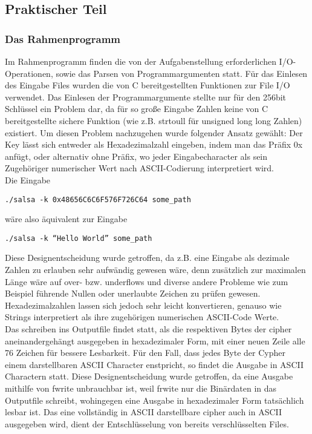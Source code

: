 \documentclass[course=erap]{aspdoc}
\begin{document}
\subsection{Praktischer Teil}
\subsubsection{Das Rahmenprogramm}
Im Rahmenprogramm finden die von der Aufgabenstellung erforderlichen I/O-Operationen, sowie das Parsen von Programmargumenten statt.
Für das Einlesen des Eingabe Files wurden die von C bereitgestellten Funktionen zur File I/O verwendet. Das Einlesen der Programmargumente stellte nur für den 256bit Schlüssel
ein Problem dar, da für so große Eingabe Zahlen keine von C bereitgestellte sichere Funktion (wie z.B. strtoull für unsigned long long Zahlen) existiert.
Um diesen Problem nachzugehen wurde folgender Ansatz gewählt:
Der Key lässt sich entweder als Hexadezimalzahl eingeben, indem man das Präfix 0x anfügt, oder alternativ ohne Präfix, wo jeder Eingabecharacter als sein Zugehöriger numerischer Wert
nach ASCII-Codierung interpretiert wird.
\\Die Eingabe 
\begin{center}
  \texttt{./salsa -k 0x48656C6C6F576F726C64  some\_path}
\end{center} 
wäre also äquivalent zur Eingabe
\begin{center}
   \texttt{./salsa -k ``Hello World'' some\_path}
\end{center}
Diese Designentscheidung wurde getroffen, da z.B. eine Eingabe als dezimale Zahlen zu erlauben sehr aufwändig gewesen wäre, denn zusätzlich zur maximalen Länge wäre auf over- bzw. underflows und diverse andere Probleme wie zum
Beispiel führende Nullen oder unerlaubte Zeichen zu prüfen gewesen. Hexadezimalzahlen lassen sich jedoch sehr leicht konvertieren, genauso wie Strings interpretiert als ihre zugehörigen numerischen ASCII-Code Werte.
\\Das schreiben ins Outputfile findet statt, als die respektiven Bytes der cipher aneinandergehängt ausgegeben in hexadezimaler Form, mit einer neuen Zeile alle 76 Zeichen für bessere Lesbarkeit.
Für den Fall, dass jedes Byte der Cypher einem darstellbaren ASCII Character enstpricht, so findet die Ausgabe in ASCII Charactern statt. Diese Designentscheidung wurde getroffen, 
da eine Ausgabe mithilfe von fwrite unbrauchbar ist, weil frwite nur die Binärdaten in das Outputfile schreibt, wohingegen eine Ausgabe in hexadezimaler Form tatsächlich lesbar ist.
Das eine vollständig in ASCII darstellbare cipher auch in ASCII ausgegeben wird, dient der Entschlüsselung von bereits verschlüsselten Files.
\end{document}

